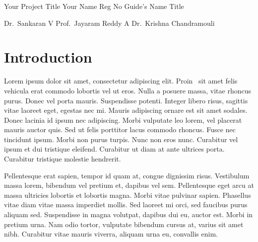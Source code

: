 \documentclass{vitmsprojectreport}
\begin{document}

\maketitlepage%
{Your Project Title}%
{Your Name}%
{Reg No}%
{Guide's Name}%
{Title}%

\makedeclarationpage

\makebonafidepage

\makeackpage%
{Dr.~Sankaran V}%
{Prof.~Jayaram Reddy A}%
{Dr.~Krishna Chandramouli}%


\tableofcontents  %
\clearpage
\listoffigures    %
\clearpage
\listoftables     %
\clearpage

\setcounter{page}{1}


\chapter{Introduction}

Lorem ipsum dolor sit amet, consectetur adipiscing elit. Proin~\cite{fowler2004uml} sit amet felis vehicula erat commodo lobortis vel ut eros. Nulla a posuere massa, vitae rhoncus purus. Donec vel porta mauris. Suspendisse potenti. Integer libero risus, sagittis vitae laoreet eget, egestas nec mi. Mauris adipiscing ornare est sit amet sodales. Donec lacinia id ipsum nec adipiscing. Morbi vulputate leo lorem, vel placerat mauris auctor quis. Sed ut felis porttitor lacus commodo rhoncus. Fusce nec tincidunt ipsum. Morbi non purus turpis. Nunc non eros nunc. Curabitur vel ipsum et dui tristique eleifend. Curabitur ut diam at ante ultrices porta. Curabitur tristique molestie hendrerit.

Pellentesque erat sapien, tempor id quam at, congue dignissim risus. Vestibulum massa lorem, bibendum vel pretium et, dapibus vel sem. Pellentesque eget arcu at massa ultricies lobortis et lobortis magna. Morbi vitae pulvinar sapien. Phasellus vitae diam vitae massa imperdiet mollis. Sed laoreet mi orci, sed faucibus purus aliquam sed. Suspendisse in magna volutpat, dapibus dui eu, auctor est. Morbi in pretium urna. Nam odio tortor, vulputate bibendum cursus at, varius sit amet nibh. Curabitur vitae mauris viverra, aliquam urna eu, convallis enim.
\end{document}
